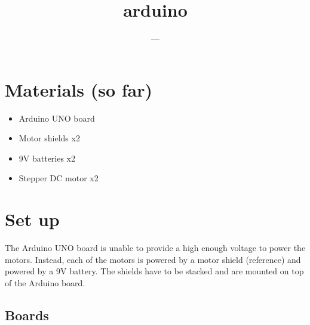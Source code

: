 \documentclass[a4paper,10pt]{article}
\title{arduino}
\author{---}
\begin{document}
\maketitle

\begin{abstract}

\end{abstract}

\section{Materials (so far)}

\begin{itemize}
 \item Arduino UNO board
 \item Motor shields x2
 \item 9V batteries x2
 \item Stepper DC motor x2
\end{itemize}

\section{Set up}

The Arduino UNO board is unable to provide a high enough voltage to power the motors. Instead, each of the motors is powered by a motor shield (reference)
and powered by a 9V battery. The shields have to be stacked and are mounted on top of the Arduino board. 

\subsection{Boards}
\end{document}
